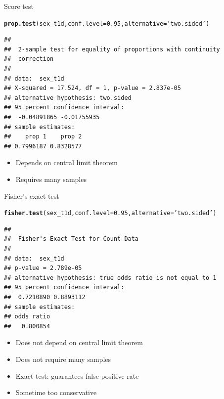 \documentclass{beamer}\usepackage[]{graphicx}\usepackage[]{color}
\makeatletter
\newcommand{\hlnum}[1]{\textcolor[rgb]{0.686,0.059,0.569}{#1}}%
\newcommand{\hlstr}[1]{\textcolor[rgb]{0.192,0.494,0.8}{#1}}%
\newcommand{\hlstd}[1]{\textcolor[rgb]{0.345,0.345,0.345}{#1}}%
\newcommand{\hlkwc}[1]{\textcolor[rgb]{0.333,0.667,0.333}{#1}}%
\newcommand{\hlkwd}[1]{\textcolor[rgb]{0.737,0.353,0.396}{\textbf{#1}}}%
\newenvironment{kframe}{%
 \def\at@end@of@kframe{}%
 \ifinner\ifhmode%
  \def\at@end@of@kframe{\end{minipage}}%
  \begin{minipage}{\columnwidth}%
 \fi\fi%
 \def\FrameCommand##1{\hskip\@totalleftmargin \hskip-\fboxsep
 \colorbox{shadecolor}{##1}\hskip-\fboxsep
     \hskip-\linewidth \hskip-\@totalleftmargin \hskip\columnwidth}%
 \MakeFramed {\advance\hsize-\width
   \@totalleftmargin\z@ \linewidth\hsize
   \@setminipage}}%
 {\par\unskip\endMakeFramed%
 \at@end@of@kframe}
\newenvironment{knitrout}{}{} %
\makeatother
\begin{document}
\begin{frame}[fragile]{Score test}
\begin{knitrout}\tiny
{}\color{fgcolor}\begin{kframe}
\begin{alltt}
\hlkwd{prop.test}\hlstd{(sex_t1d,} \hlkwc{conf.level}\hlstd{=}\hlnum{0.95}\hlstd{,} \hlkwc{alternative}\hlstd{=}\hlstr{'two.sided'}\hlstd{)}
\end{alltt}
\begin{verbatim}
## 
## 	2-sample test for equality of proportions with continuity
## 	correction
## 
## data:  sex_t1d
## X-squared = 17.524, df = 1, p-value = 2.837e-05
## alternative hypothesis: two.sided
## 95 percent confidence interval:
##  -0.04891865 -0.01755935
## sample estimates:
##    prop 1    prop 2 
## 0.7996187 0.8328577
\end{verbatim}
\end{kframe}
\end{knitrout}
  \begin{itemize}
    \item Depends on central limit theorem
    \item Requires many samples
  \end{itemize}
\end{frame}

\begin{frame}[fragile]{Fisher's exact test}
\begin{knitrout}\tiny
{}\color{fgcolor}\begin{kframe}
\begin{alltt}
\hlkwd{fisher.test}\hlstd{(sex_t1d,} \hlkwc{conf.level}\hlstd{=}\hlnum{0.95}\hlstd{,} \hlkwc{alternative}\hlstd{=}\hlstr{'two.sided'}\hlstd{)}
\end{alltt}
\begin{verbatim}
## 
## 	Fisher's Exact Test for Count Data
## 
## data:  sex_t1d
## p-value = 2.789e-05
## alternative hypothesis: true odds ratio is not equal to 1
## 95 percent confidence interval:
##  0.7210890 0.8893112
## sample estimates:
## odds ratio 
##   0.800854
\end{verbatim}
\end{kframe}
\end{knitrout}
  \begin{itemize}
    \item Does not depend on central limit theorem
    \item Does not require many samples
    \item Exact test: guarantees false positive rate
    \item Sometime too conservative
  \end{itemize}
\end{frame}
\end{document}
